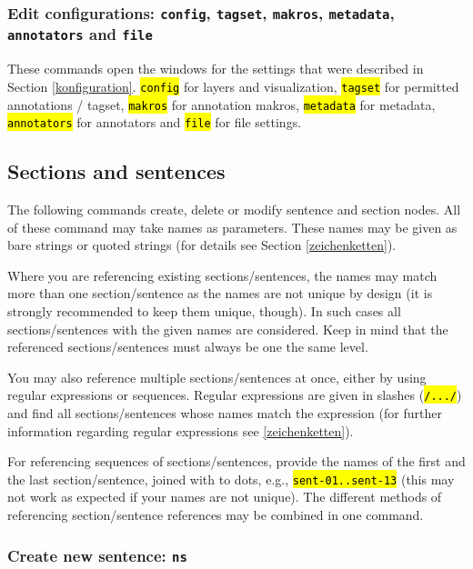 \documentclass[12pt]{scrartcl}
\newcommand{\code}[1]{\hl{\texttt{#1}}}
\begin{document}
\subsubsection{Edit configurations: \texttt{config}, \texttt{tagset}, \texttt{makros}, \texttt{metadata}, \texttt{annotators} and \texttt{file}}

These commands open the windows for the settings that were described in Section \ref{konfiguration}.
\code{config} for layers and visualization, \code{tagset} for permitted annotations / tagset, \code{makros} for annotation makros, \code{metadata} for metadata, \code{annotators} for annotators and \code{file} for file settings.


\subsection{Sections and sentences}

The following commands create, delete or modify sentence and section nodes.
All of these command may take names as parameters.
These names may be given as bare strings or quoted strings (for details see Section \ref{zeichenketten}).

Where you are referencing existing sections/sentences, the names may match more than one section/sentence as the names are not unique by design (it is strongly recommended to keep them unique, though).
In such cases all sections/sentences with the given names are considered. Keep in mind that the referenced sections/sentences must always be one the same level.

You may also reference multiple sections/sentences at once, either by using regular expressions or sequences.
Regular expressions are given in slashes (\code{/.../}) and find all sections/sentences whose names match the expression (for further information regarding regular expressions see \ref{zeichenketten}).

For referencing sequences of sections/sentences, provide the names of the first and the last section/sentence, joined with to dots, e.g., \code{sent-01..sent-13} (this may not work as expected if your names are not unique).
The different methods of referencing section/sentence references may be combined in one command.

\subsubsection{Create new sentence: \texttt{ns}}\label{befehl-ns}
\end{document}
